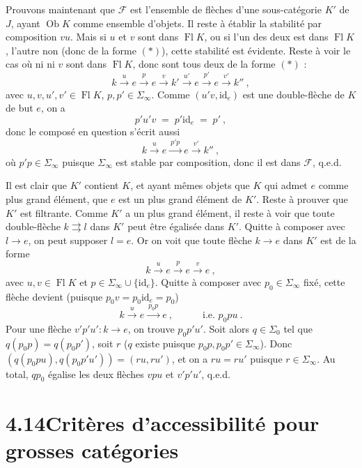 \documentclass[11pt]{article}
\newcommand{\printedpage}[1]{\marginpar{\footnotesize p.~#1}}
\newcommand{\msp}[1]{\marginpar{\footnotesize [#1]}}
\newcommand{\Fl}{\operatorname{Fl}}
\newcommand{\Ob}{\operatorname{Ob}}
\newcommand{\id}{\mathrm{id}}
\begin{document}
Prouvons maintenant que $\mathcal{F}$ est l'ensemble de flèches d'une sous-catégorie $K'$ de $J$, ayant $\Ob K$ comme ensemble d'objets. Il reste à établir la stabilité par composition $vu$. Mais si $u$ et $v$ sont dans $\Fl K$, ou si l'un des deux est dans $\Fl K$, l'autre non (donc de la forme $(*)$), cette stabilité est évidente. Reste à voir le cas où ni ni $v$ sont dans $\Fl K$, donc sont tous deux de la forme $(*)$ :
\[
k \xrightarrow{\ u\ } e \xrightarrow{\ p\ } e \xrightarrow{\ v\ } k' \xrightarrow{\ u'\ } e \xrightarrow{\ p'\ } e \xrightarrow{\ v'\ } k''\ ,
\]
avec $u,v,u',v'\in\Fl K$, $p,p'\in\Sigma_\infty$. Comme $(u'v,\id_e)$ est une double-flèche de
\printedpage{140}
\msp{page 369}
$K$ de but $e$, on a
\[
p'u'v \;=\; p'\id_e \;=\; p'\ ,
\]
donc le composé en question s'écrit aussi
\[
k \xrightarrow{\ u\ } e \xrightarrow{\ p'p\ } e \xrightarrow{\ v'\ } k''\ ,
\]
où $p'p\in\Sigma_\infty$ puisque $\Sigma_\infty$ est stable par composition, donc il est dans $\mathcal{F}$, q.e.d.

Il est clair que $K'$ contient $K$, et ayant mêmes objets que $K$ qui admet $e$ comme plus grand élément, que $e$ est un plus grand élément de $K'$. Reste à prouver que $K'$ est filtrante. Comme $K'$ a un plus grand élément, il reste à voir que toute double-flèche $k\rightrightarrows l$ dans $K'$ peut être égalisée dans $K'$. Quitte à composer avec $l\longrightarrow e$, on peut supposer $l=e$. Or on voit que toute flèche $k\longrightarrow e$ dans $K'$ est de la forme
\[
k \xrightarrow{\ u\ } e \xrightarrow{\ p\ } e \xrightarrow{\ v\ } e\ ,
\]
avec $u,v\in\Fl K$ et $p\in\Sigma_\infty\cup\{\id_e\}$. Quitte à composer avec $p_0\in\Sigma_\infty$ fixé, cette flèche devient (puisque $p_0v=p_0\id_e=p_0$)
\[
k \xrightarrow{\ u\ } e \xrightarrow{\ p_0p\ } e\ , \qquad\quad \text{i.e. } p_0pu\ .
\]
Pour une flèche $v'p'u' : k\longrightarrow e$, on trouve $p_0p'u'$. Soit alors $q\in\Sigma_0$ tel que $q(p_0p)=q(p_0p')$, soit $r$ ($q$ existe puisque $p_0p,p_0p'\in\Sigma_\infty$). Donc $(q(p_0pu),q(p_0p'u'))=(ru,ru')$, et on a $ru=ru'$ puisque $r\in\Sigma_\infty$. Au total, $qp_0$ égalise les deux flèches $vpu$ et $v'p'u'$, q.e.d.

\msp{page 370}

\section*{4.14\quad Critères d'accessibilité pour grosses catégories}
\end{document}
